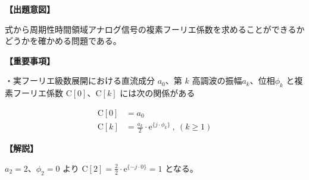 \noindent \textbf{【出題意図】}

\bigskip
\noindent 式から周期性時間領域アナログ信号の複素フーリエ係数を求めることができるかどうかを確かめる問題である。

\vspace{1em}
\noindent \textbf{【重要事項】}

\medskip
\noindent・実フーリエ級数展開における直流成分 $a_0$、第 $k$ 高調波の振幅$a_k$、位相$\phi_k$ と複素フーリエ係数 $\textrm{C}[0]$、$\textrm{C}[k]$ には次の関係がある

\begin{align*}
\textrm{C}[0] &= a_0 \\
\textrm{C}[k] &= \frac{a_k}{2} \cdot \textrm{e}^{\{j \cdot \phi_k \}} \ ,\ (k\geq 1)
\end{align*}


\bigskip

\vspace{1em}
\noindent \textbf{【解説】}

\bigskip
\noindent $a_2 = 2$、$\phi_2 = 0$ より $\textrm{C}[2] = \frac{2}{2} \cdot \textrm{e}^{\{ -j \cdot 0 \}} = 1$ となる。
